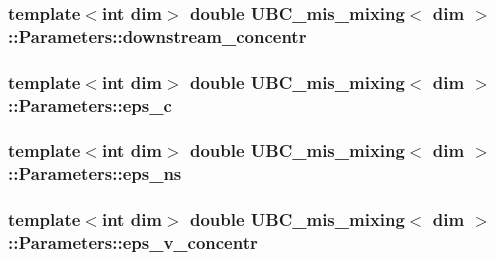 \subsubsection[{downstream\+\_\+concentr}]{\setlength{\rightskip}{0pt plus 5cm}template$<$int dim$>$ double {\bf U\+B\+C\+\_\+mis\+\_\+mixing}$<$ dim $>$\+::Parameters\+::downstream\+\_\+concentr}\label{struct_u_b_c__mis__mixing_1_1_parameters_a398a5206459752d26d9851834bb8ef43}
\hypertarget{struct_u_b_c__mis__mixing_1_1_parameters_a1d20b15ac5ae8fb61fab2027e003b010}{}
\subsubsection[{eps\+\_\+c}]{\setlength{\rightskip}{0pt plus 5cm}template$<$int dim$>$ double {\bf U\+B\+C\+\_\+mis\+\_\+mixing}$<$ dim $>$\+::Parameters\+::eps\+\_\+c}\label{struct_u_b_c__mis__mixing_1_1_parameters_a1d20b15ac5ae8fb61fab2027e003b010}
\hypertarget{struct_u_b_c__mis__mixing_1_1_parameters_a59539a74b2a7b5ada31dbb529ff21d9f}{}
\subsubsection[{eps\+\_\+ns}]{\setlength{\rightskip}{0pt plus 5cm}template$<$int dim$>$ double {\bf U\+B\+C\+\_\+mis\+\_\+mixing}$<$ dim $>$\+::Parameters\+::eps\+\_\+ns}\label{struct_u_b_c__mis__mixing_1_1_parameters_a59539a74b2a7b5ada31dbb529ff21d9f}
\hypertarget{struct_u_b_c__mis__mixing_1_1_parameters_af91b302127463e747b8a814c51889eae}{}
\subsubsection[{eps\+\_\+v\+\_\+concentr}]{\setlength{\rightskip}{0pt plus 5cm}template$<$int dim$>$ double {\bf U\+B\+C\+\_\+mis\+\_\+mixing}$<$ dim $>$\+::Parameters\+::eps\+\_\+v\+\_\+concentr}\label{struct_u_b_c__mis__mixing_1_1_parameters_af91b302127463e747b8a814c51889eae}
\hypertarget{struct_u_b_c__mis__mixing_1_1_parameters_a13ee78e31e67b8d1f2cdc298e55fcad9}{}
